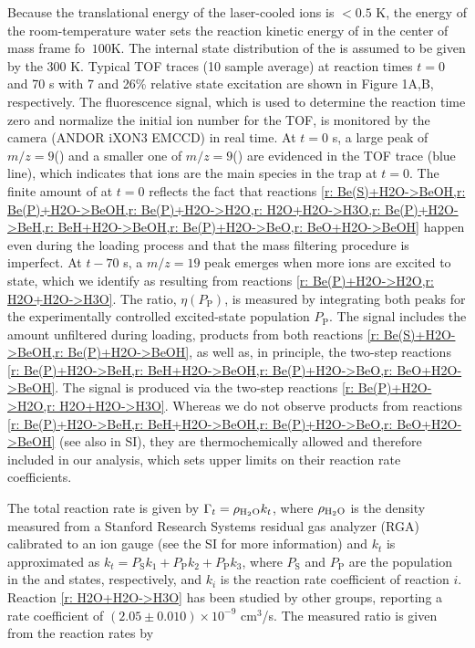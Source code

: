 Because the translational energy of the laser-cooled  ions is $<0.5$ K, the energy of the room-temperature water sets the reaction kinetic energy of  in the center of mass frame fo $~100$K. The internal state distribution of the  is assumed to be given by the 300 K. Typical TOF traces (10 sample average) at reaction times $t=0$ and 70 s with 7 and 26\% relative  state excitation are shown in Figure 1A,B, respectively. The fluorescence signal, which is used to determine the reaction time zero and normalize the initial ion number for the TOF, is monitored by the camera (ANDOR iXON3 EMCCD) in real time. At $t=0$ s, a large peak of $m/z=9$() and a smaller one of $m/z=9$() are evidenced in the TOF trace (blue line), which indicates that  ions are the main species in the trap at $t=0$. The finite amount of  at $t=0$ reflects the fact that reactions \cref{r: Be(S)+H2O->BeOH,r: Be(P)+H2O->BeOH,r: Be(P)+H2O->H2O,r: H2O+H2O->H3O,r: Be(P)+H2O->BeH,r: BeH+H2O->BeOH,r: Be(P)+H2O->BeO,r: BeO+H2O->BeOH} happen even during the loading process and that the mass filtering procedure is imperfect. At $t-70$ s, a $m/z=19$ peak emerges when more  ions are excited to  state, which we identify as  resulting from reactions \cref{r: Be(P)+H2O->H2O,r: H2O+H2O->H3O}. The  ratio, $\eta(P_\text{P})$, is measured by integrating both peaks for the experimentally controlled excited-state population $P_\text{P}$. The  signal includes the amount unfiltered during loading, products from both reactions \cref{r: Be(S)+H2O->BeOH,r: Be(P)+H2O->BeOH}, as well as, in principle, the two-step reactions \cref{r: Be(P)+H2O->BeH,r: BeH+H2O->BeOH,r: Be(P)+H2O->BeO,r: BeO+H2O->BeOH}. The  signal is produced via the two-step reactions \cref{r: Be(P)+H2O->H2O,r: H2O+H2O->H3O}. Whereas we do not observe products from reactions \cref{r: Be(P)+H2O->BeH,r: BeH+H2O->BeOH,r: Be(P)+H2O->BeO,r: BeO+H2O->BeOH} (see also  in SI), they are thermochemically allowed and therefore included in our analysis, which sets upper limits on their reaction rate coefficients.

The total reaction rate is given by $\Gamma_t = \rho_{\ce{H2O}} k_t$, where $\rho_{\ce{H2O}}$ is the  density measured from a Stanford Research Systems residual gas analyzer (RGA) calibrated to an ion gauge (see the SI for more information) and $k_t$ is approximated as $k_t = P_\text{S} k_1 + P_\text{P} k_2 + P_\text{P} k_3$, where $P_\text{S}$ and $P_\text{P}$ are the  population in the  and  states, respectively, and $k_i$ is the reaction rate coefficient of reaction $i$. Reaction \cref{r: H2O+H2O->H3O} has been studied by other groups, reporting a rate coefficient of $(2.05 \pm 0.010) \times 10^{-9}$ cm$^3$/s.\cite{Huntress2004} The measured  ratio is given from the reaction rates by

